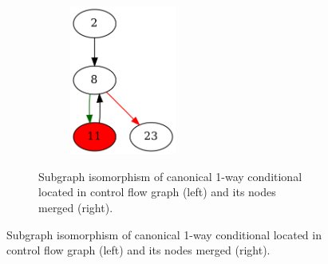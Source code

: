 \documentclass[aspectratio=1610]{beamer}
\begin{document}
\begin{frame}
\begin{figure}[htbp]
\begin{subfigure}[b]{0.65\textwidth}
\begin{subfigure}[ht]{0.40\textwidth}
			\end{subfigure}
			\quad
			\begin{subfigure}[ht]{0.40\textwidth}
				\centering
				\includegraphics[width=0.5\textwidth]{inc/methods/hammock/main_0002b.png}
			\end{subfigure}
			\caption{Subgraph isomorphism of canonical 1-way conditional located in control flow graph (left) and its nodes merged (right).}
		\end{subfigure}
	\end{figure}
\end{frame}

\end{document}
